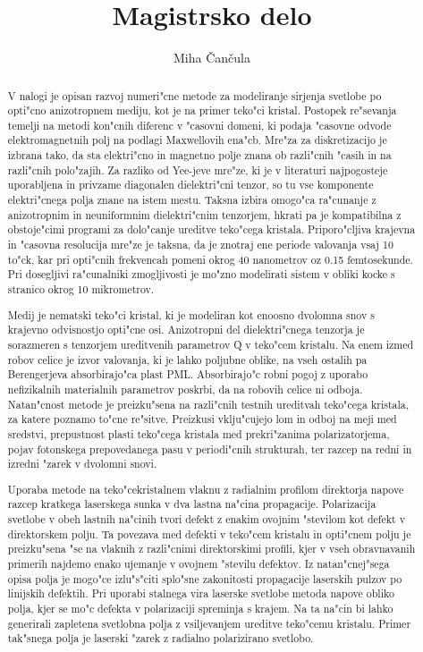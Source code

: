 \documentclass[a4paper,10pt]{article}
\title{Magistrsko delo}
\author{Miha \v Can\v cula}
\begin{document}
\maketitle

\begin{abstract}
V nalogi je opisan razvoj numeri"cne metode za modeliranje sirjenja svetlobe po opti"cno anizotropnem mediju, kot je na primer teko"ci kristal. 
Postopek re"sevanja temelji na metodi kon"cnih diferenc v "casovni domeni, ki podaja "casovne odvode elektromagnetnih polj na podlagi Maxwellovih ena"cb. 
Mre"za za diskretizacijo je izbrana tako, da sta elektri"cno in magnetno polje znana ob razli"cnih "casih in na razli"cnih polo"zajih. 
Za razliko od Yee-jeve mre"ze, ki je v literaturi najpogosteje uporabljena in privzame diagonalen dielektri"cni tenzor, so tu vse komponente elektri"cnega polja znane na istem mestu. 
Taksna izbira omogo"ca ra"cunanje z anizotropnim in neuniformnim dielektri"cnim tenzorjem, hkrati pa je kompatibilna z obstoje"cimi programi za dolo"canje ureditve teko"cega kristala. 
Priporo"cljiva krajevna in "casovna resolucija mre"ze je taksna, da je znotraj ene periode valovanja vsaj 10 to"ck, kar pri opti"cnih frekvencah pomeni okrog 40 nanometrov oz 0.15 femtosekunde. 
Pri dosegljivi ra"cunalniki zmogljivosti je mo"zno modelirati sistem v obliki kocke s stranico okrog 10 mikrometrov.

Medij je nematski teko"ci kristal, ki je modeliran kot enoosno dvolomna snov s krajevno odvisnostjo opti"cne osi. 
Anizotropni del dielektri"cnega tenzorja je sorazmeren s tenzorjem ureditvenih parametrov Q v teko"cem kristalu. 
Na enem izmed robov celice je izvor valovanja, ki je lahko poljubne oblike, na vseh ostalih pa Berengerjeva absorbirajo"ca plast PML. 
Absorbirajo"c robni pogoj z uporabo nefizikalnih materialnih parametrov poskrbi, da na robovih celice ni odboja. 
Natan"cnost metode je preizku"sena na razli"cnih testnih ureditvah teko"cega kristala, za katere poznamo to"cne re"sitve. 
Preizkusi vklju"cujejo lom in odboj na meji med sredstvi, prepustnost plasti teko"cega kristala med prekri"zanima polarizatorjema, pojav fotonskega prepovedanega pasu v periodi"cnih strukturah, ter razcep na redni in izredni "zarek v dvolomni snovi.

Uporaba metode na teko"cekristalnem vlaknu z radialnim profilom direktorja napove razcep kratkega laserskega sunka v dva lastna na"cina propagacije. 
Polarizacija svetlobe v obeh lastnih na"cinih tvori defekt z enakim ovojnim "stevilom kot defekt v direktorskem polju. 
Ta povezava med defekti v teko"cem kristalu in opti"cnem polju je preizku"sena "se na vlaknih z razli"cnimi direktorskimi profili, kjer v vseh obravnavanih primerih najdemo enako ujemanje v ovojnem "stevilu defektov. 
Iz natan"cnej"sega opisa polja je mogo"ce izlu"s"citi splo"sne zakonitosti propagacije laserskih pulzov po linijskih defektih. 
Pri uporabi stalnega vira laserske svetlobe metoda napove obliko polja, kjer se mo"c defekta v polarizaciji spreminja s krajem. 
Na ta na"cin bi lahko generirali zapletena svetlobna polja z vsiljevanjem ureditve teko"cemu kristalu.
Primer tak"snega polja je laserski "zarek z radialno polarizirano svetlobo. 
\end{abstract}
\end{document}
